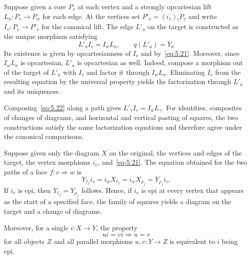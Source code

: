 \begin{construction}\label{cons:5.18}

Suppose given a core $P_v$ at each vertex and a strongly opcartesian lift $L_a:P_v\to P_w$
for each edge. At the vertices set $P'_v=(i_v)_!P_v$ and write $I_v:P_v\to P'_v$ for the
canonical lift. The edge $L'_a$ on the target is constructed as the unique morphism
satisfying
\begin{equation*}
L'_a I_v=I_wL_a,\qquad q(L'_a)=Y_a
\tag{5.22}\label{eq:5.22}
\end{equation*}
Its existence is given by opcartesianness of $I_v$ and by~\eqref{eq:5.21}. Moreover, since
$I_wL_a$ is opcartesian, $L'_a$ is opcartesian as well. Indeed, compose a morphism out of
the target of $L'_a$ with $I_v$ and factor it through $I_wL_a$. Eliminating $I_v$ from the
resulting equation by the universal property yields the factorization through $L'_a$ and
its uniqueness.

Composing~\eqref{eq:5.22} along a path gives $L'_\gamma I_v=I_wL_\gamma$. For identities,
composites of changes of diagrams, and horizontal and vertical pasting of squares, the two
constructions satisfy the same factorization equations and therefore agree under the
canonical comparisons.

\end{construction}

\begin{proposition}\label{prop:5.19}

Suppose given only the diagram $X$ on the original, the vertices and edges of the target,
the vertex morphisms $i_v$, and~\eqref{eq:5.21}. The equation obtained for the two paths of
a face $f:v\Rightarrow w$ is
\begin{equation*}
Y_{\ell_f}i_v=i_wX_{\ell_f}
=i_wX_{\rho_f}=Y_{\rho_f}i_v.
\tag{5.23}\label{eq:5.23}
\end{equation*}
If $i_v$ is epi, then $Y_{\ell_f}=Y_{\rho_f}$ follows. Hence, if $i_v$ is epi at every
vertex that appears as the start of a specified face, the family of squares yields a diagram
on the target and a change of diagrams.

Moreover, for a single $i:X\to Y$, the property
\begin{equation*}
ui=vi\Longrightarrow u=v
\tag{5.24}\label{eq:5.24}
\end{equation*}
for all objects $Z$ and all parallel morphisms $u,v:Y\to Z$ is equivalent to $i$ being epi.

\end{proposition}

